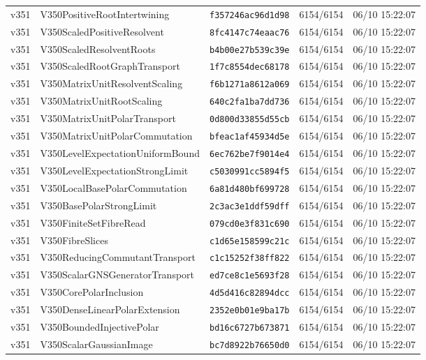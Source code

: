 \documentclass[11pt]{article}
\theoremstyle{definition}\newtheorem{deriv}{Derivation}
\begin{document}
{\begin{longtable}{@{}lllll@{}}
v351 & V350PositiveRootIntertwining & \texttt{f357246ac96d1d98} & 6154/6154 & 06/10 15:22:07 \\
v351 & V350ScaledPositiveResolvent & \texttt{8fc4147c74eaac76} & 6154/6154 & 06/10 15:22:07 \\
v351 & V350ScaledResolventRoots & \texttt{b4b00e27b539c39e} & 6154/6154 & 06/10 15:22:07 \\
v351 & V350ScaledRootGraphTransport & \texttt{1f7c8554dec68178} & 6154/6154 & 06/10 15:22:07 \\
v351 & V350MatrixUnitResolventScaling & \texttt{f6b1271a8612a069} & 6154/6154 & 06/10 15:22:07 \\
v351 & V350MatrixUnitRootScaling & \texttt{640c2fa1ba7dd736} & 6154/6154 & 06/10 15:22:07 \\
v351 & V350MatrixUnitPolarTransport & \texttt{0d800d33855d55cb} & 6154/6154 & 06/10 15:22:07 \\
v351 & V350MatrixUnitPolarCommutation & \texttt{bfeac1af45934d5e} & 6154/6154 & 06/10 15:22:07 \\
v351 & V350LevelExpectationUniformBound & \texttt{6ec762be7f9014e4} & 6154/6154 & 06/10 15:22:07 \\
v351 & V350LevelExpectationStrongLimit & \texttt{c5030991cc5894f5} & 6154/6154 & 06/10 15:22:07 \\
v351 & V350LocalBasePolarCommutation & \texttt{6a81d480bf699728} & 6154/6154 & 06/10 15:22:07 \\
v351 & V350BasePolarStrongLimit & \texttt{2c3ac3e1ddf59dff} & 6154/6154 & 06/10 15:22:07 \\
v351 & V350FiniteSetFibreRead & \texttt{079cd0e3f831c690} & 6154/6154 & 06/10 15:22:07 \\
v351 & V350FibreSlices & \texttt{c1d65e158599c21c} & 6154/6154 & 06/10 15:22:07 \\
v351 & V350ReducingCommutantTransport & \texttt{c1c15252f38ff822} & 6154/6154 & 06/10 15:22:07 \\
v351 & V350ScalarGNSGeneratorTransport & \texttt{ed7ce8c1e5693f28} & 6154/6154 & 06/10 15:22:07 \\
v351 & V350CorePolarInclusion & \texttt{4d5d416c82894dcc} & 6154/6154 & 06/10 15:22:07 \\
v351 & V350DenseLinearPolarExtension & \texttt{2352e0b01e9ba17b} & 6154/6154 & 06/10 15:22:07 \\
v351 & V350BoundedInjectivePolar & \texttt{bd16c6727b673871} & 6154/6154 & 06/10 15:22:07 \\
v351 & V350ScalarGaussianImage & \texttt{bc7d8922b76650d0} & 6154/6154 & 06/10 15:22:07 \\

\end{longtable}}
\end{document}
